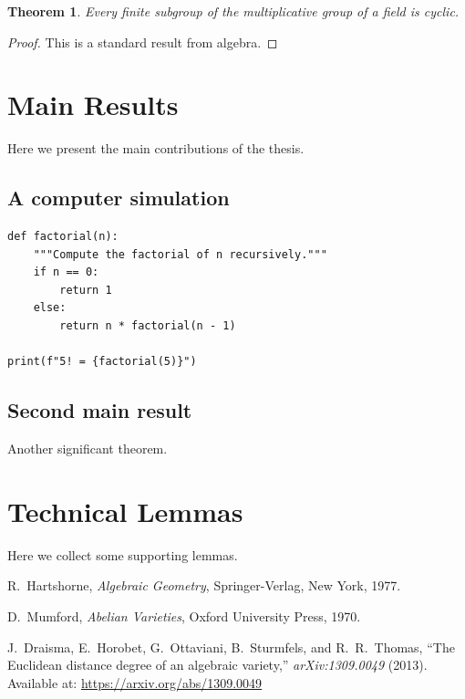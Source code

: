 \documentclass[12pt,reqno,oneside]{amsbook}
\newtheorem{theorem}{Theorem}[chapter]
\theoremstyle{definition}
\begin{document}
\begin{theorem}
Every finite subgroup of the multiplicative group of a field is cyclic.
\end{theorem}

\begin{proof}
This is a standard result from algebra.
\end{proof}

\chapter{Main Results}
Here we present the main contributions of the thesis.

\section{A computer simulation}

\begin{lstlisting}[basicstyle = \ttfamily\small,resetmargins=true,tabsize=5,extendedchars=false]
def factorial(n):
    """Compute the factorial of n recursively."""
    if n == 0:
        return 1
    else:
        return n * factorial(n - 1)

print(f"5! = {factorial(5)}")
\end{lstlisting}



\section{Second main result}
Another significant theorem.

\appendix
\chapter{Technical Lemmas}
Here we collect some supporting lemmas.

\backmatter 

\begin{thebibliography}{9}


R.~Hartshorne, \emph{Algebraic Geometry}, Springer-Verlag, New York, 1977.

D.~Mumford, \emph{Abelian Varieties}, Oxford University Press, 1970.

J.~Draisma, E.~Horobet, G.~Ottaviani, B.~Sturmfels, and R.~R.~Thomas, 
``The Euclidean distance degree of an algebraic variety,'' 
\emph{arXiv:1309.0049} (2013).  
Available at: \href{https://arxiv.org/abs/1309.0049}{https://arxiv.org/abs/1309.0049}

\end{thebibliography}
\end{document}
